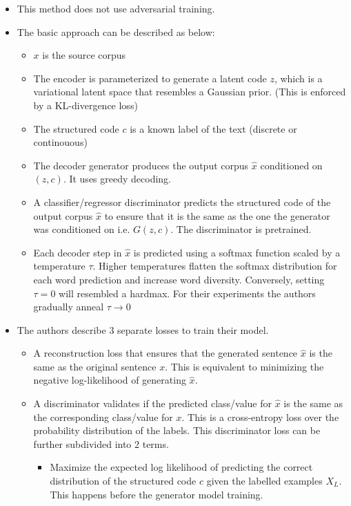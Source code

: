 \documentclass[12pt]{article}
\begin{document}
  \begin{itemize}
    \item This method does not use adversarial training.
    \item The basic approach can be described as below:
    \begin{itemize}
      \item $x$ is the source corpus
      \item The encoder is parameterized to generate a latent code $z$, which is a variational latent space that resembles a Gaussian prior. (This is enforced by a KL-divergence loss)
      \item The structured code $c$ is a known label of the text (discrete or continouous)
      \item The decoder generator produces the output corpus $\hat{x}$ conditioned on $(z, c)$. It uses greedy decoding.
      \item A classifier/regressor discriminator predicts the structured code of the output corpus $\hat{x}$ to ensure that it is the same as the one the generator was conditioned on i.e. $G(z, c)$. The discriminator is pretrained.
      \item Each decoder step in $\hat{x}$ is predicted using a softmax function scaled by a temperature $\tau$. Higher temperatures flatten the softmax distribution for each word prediction and increase word diversity. Conversely, setting $\tau = 0$ will resembled a hardmax. For their experiments the authors gradually anneal $\tau \rightarrow 0$
    \end{itemize}
    \item The authors describe 3 separate losses to train their model.
    \begin{itemize}
      \item A reconstruction loss that ensures that the generated sentence $\hat{x}$ is the same as the original sentence $x$. This is equivalent to minimizing the negative log-likelihood of generating $\hat{x}$.
      \item A discriminator validates if the predicted class/value for $\hat{x}$ is the same as the corresponding class/value for $x$. This is a cross-entropy loss over the probability distribution of the labels. This discriminator loss can be further subdivided into 2 terms.
      \begin{itemize}
        \item Maximize the expected log likelihood of predicting the correct distribution of the structured code $c$ given the labelled examples $X_L$. This happens before the generator model training.

\end{itemize}
\end{itemize}
\end{itemize}
\end{document}
